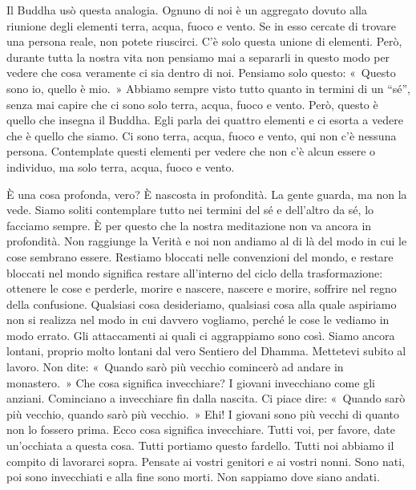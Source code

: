 Il Buddha usò questa analogia. Ognuno di noi è un aggregato dovuto alla
riunione degli elementi terra, acqua, fuoco e vento. Se in esso cercate
di trovare una persona reale, non potete riuscirci. C'è solo questa
unione di elementi. Però, durante tutta la nostra vita non pensiamo mai
a separarli in questo modo per vedere che cosa veramente ci sia dentro
di noi. Pensiamo solo questo: «~Questo sono io, quello è mio.~» Abbiamo
sempre visto tutto quanto in termini di un ``sé'', senza mai capire che
ci sono solo terra, acqua, fuoco e vento. Però, questo è quello che
insegna il Buddha. Egli parla dei quattro elementi e ci esorta a vedere
che è quello che siamo. Ci sono terra, acqua, fuoco e vento, qui non c'è
nessuna persona. Contemplate questi elementi per vedere che non c'è
alcun essere o individuo, ma solo terra, acqua, fuoco e vento.

È una cosa profonda, vero? È nascosta in profondità. La gente guarda, ma
non la vede. Siamo soliti contemplare tutto nei termini del sé e
dell'altro da sé, lo facciamo sempre. È per questo che la nostra
meditazione non va ancora in profondità. Non raggiunge la Verità e noi
non andiamo al di là del modo in cui le cose sembrano essere. Restiamo
bloccati nelle convenzioni del mondo, e restare bloccati nel mondo
significa restare all'interno del ciclo della trasformazione: ottenere
le cose e perderle, morire e nascere, nascere e morire, soffrire nel
regno della confusione. Qualsiasi cosa desideriamo, qualsiasi cosa alla
quale aspiriamo non si realizza nel modo in cui davvero vogliamo, perché
le cose le vediamo in modo errato. Gli attaccamenti ai quali ci
aggrappiamo sono così. Siamo ancora lontani, proprio molto lontani dal
vero Sentiero del Dhamma. Mettetevi subito al lavoro. Non dite: «~Quando
sarò più vecchio comincerò ad andare in monastero.~» Che cosa significa
invecchiare? I giovani invecchiano come gli anziani. Cominciano a
invecchiare fin dalla nascita. Ci piace dire: «~Quando sarò più vecchio,
quando sarò più vecchio.~» Ehi! I giovani sono più vecchi di quanto non
lo fossero prima. Ecco cosa significa invecchiare. Tutti voi, per
favore, date un'occhiata a questa cosa. Tutti portiamo questo fardello.
Tutti noi abbiamo il compito di lavorarci sopra. Pensate ai vostri
genitori e ai vostri nonni. Sono nati, poi sono invecchiati e alla fine
sono morti. Non sappiamo dove siano andati.

